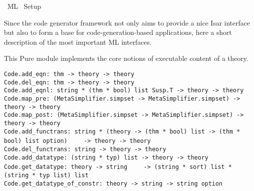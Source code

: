 %
\begin{isabellebody}%
\def\isabellecontext{ML}%
%
\isadelimtheory
%
\endisadelimtheory
%
\isatagtheory
{}\isamarkupfalse%
\ {\isachardoublequoteopen}ML{\isachardoublequoteclose}\isanewline
{}\ Setup\isanewline
{}%
\endisatagtheory
{\isafoldtheory}%
%
\isadelimtheory
%
\endisadelimtheory
%
\isamarkuptrue%
%
\begin{isamarkuptext}%
Since the code generator framework not only aims to provide
  a nice Isar interface but also to form a base for
  code-generation-based applications, here a short
  description of the most important ML interfaces.%
\end{isamarkuptext}%
\isamarkuptrue%
%
\isamarkuptrue%
%
\begin{isamarkuptext}%
This Pure module implements the core notions of
  executable content of a theory.%
\end{isamarkuptext}%
\isamarkuptrue%
%
\isamarkuptrue%
%
\isadelimmlref
%
\endisadelimmlref
%
\isatagmlref
%
\begin{isamarkuptext}%
\begin{mldecls}
  \verb|Code.add_eqn: thm -> theory -> theory| \\
  \verb|Code.del_eqn: thm -> theory -> theory| \\
  \verb|Code.add_eqnl: string * (thm * bool) list Susp.T -> theory -> theory| \\
  \verb|Code.map_pre: (MetaSimplifier.simpset -> MetaSimplifier.simpset) -> theory -> theory| \\
  \verb|Code.map_post: (MetaSimplifier.simpset -> MetaSimplifier.simpset) -> theory -> theory| \\
  \verb|Code.add_functrans: string * (theory -> (thm * bool) list -> (thm * bool) list option)|\isasep\isanewline%
\verb|    -> theory -> theory| \\
  \verb|Code.del_functrans: string -> theory -> theory| \\
  \verb|Code.add_datatype: (string * typ) list -> theory -> theory| \\
  \verb|Code.get_datatype: theory -> string|\isasep\isanewline%
\verb|    -> (string * sort) list * (string * typ list) list| \\
  \verb|Code.get_datatype_of_constr: theory -> string -> string option|
  \end{mldecls}


\end{isamarkuptext}
\end{isabellebody}
